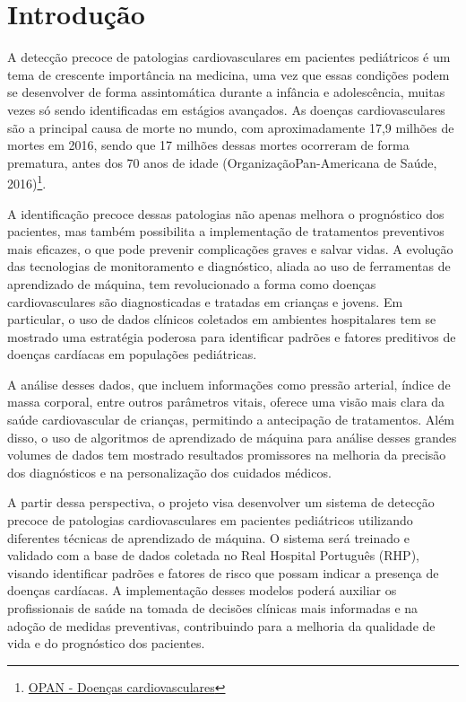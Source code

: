 \documentclass[10pt, conference, compsocconf]{IEEEtran}
\begin{document}
\section{Introdução}
A detecção precoce de patologias cardiovasculares em pacientes pediátricos é um tema de crescente importância na medicina, uma vez que essas condições podem se desenvolver de 
forma assintomática durante a infância e adolescência, muitas vezes só sendo identificadas em estágios avançados. As doenças cardiovasculares são a principal causa de morte no mundo, 
com aproximadamente 17,9 milhões de mortes em 2016, sendo que 17 milhões dessas mortes ocorreram de forma prematura, antes dos 70 anos de idade (OrganizaçãoPan-Americana de Saúde, 2016)\footnote{\href{https://www.paho.org/pt/topicos/doencas-cardiovasculares}{OPAN - Doenças cardiovasculares}}. 

A identificação precoce dessas patologias não apenas melhora o prognóstico dos pacientes, mas também possibilita a implementação de tratamentos preventivos mais eficazes, o que pode 
prevenir complicações graves e salvar vidas. A evolução das tecnologias de monitoramento e diagnóstico, aliada ao uso de ferramentas de aprendizado de máquina, tem revolucionado a forma 
como doenças cardiovasculares são diagnosticadas e tratadas em crianças e jovens. Em particular, o uso de dados clínicos coletados em ambientes hospitalares tem se mostrado uma estratégia 
poderosa para identificar padrões e fatores preditivos de doenças cardíacas em populações pediátricas. 

A análise desses dados, que incluem informações como pressão arterial, índice de
massa corporal, entre outros parâmetros vitais, oferece uma visão mais clara da saúde cardiovascular de crianças, permitindo a antecipação de tratamentos. Além disso, o uso de algoritmos 
de aprendizado de máquina para análise desses grandes volumes de dados tem mostrado resultados promissores na melhoria da precisão dos diagnósticos e na personalização dos cuidados 
médicos. 

A partir dessa perspectiva, o projeto visa desenvolver um sistema de detecção precoce de patologias cardiovasculares em pacientes pediátricos 
utilizando diferentes técnicas de aprendizado de máquina. O sistema será treinado e validado com a base de dados coletada no Real Hospital Português (RHP), visando identificar padrões 
e fatores de risco que possam indicar a presença de doenças cardíacas. A implementação desses modelos poderá auxiliar os profissionais de saúde na tomada de decisões clínicas 
mais informadas e na adoção de medidas preventivas, contribuindo para a melhoria da qualidade de vida e do prognóstico dos pacientes.
\end{document}
